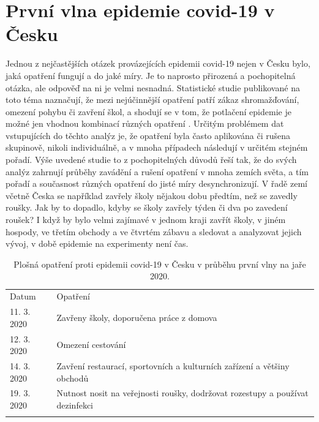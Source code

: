 \section*{První vlna epidemie covid-19 v Česku}

Jednou z nejčastějších otázek provázejících epidemii covid-19 nejen v Česku bylo, jaká opatření fungují a do jaké míry. Je to naprosto přirozená a pochopitelná otázka, ale odpověď na ni je velmi nesnadná. Statistické studie publikované na toto téma naznačují, že mezi nejúčinnější opatření patří zákaz shromažďování, omezení pohybu či zavření škol, a shodují se v tom, že potlačení epidemie je možné jen vhodnou kombinací různých opatření \cite{Flaxman_etal2020,Li_etal2020,Haug_etal2020,Liu_etal2021}. Určitým problémem dat vstupujících do těchto analýz je, že opatření byla často aplikována či rušena skupinově, nikoli individuálně, a v mnoha případech následují v určitém stejném pořadí. Výše uvedené studie to z pochopitelných důvodů řeší tak, že do svých analýz zahrnují průběhy zavádění a rušení opatření v mnoha zemích světa, a tím pořadí a současnost různých opatření do jisté míry desynchronizují. V řadě zemí včetně Česka se například zavřely školy nějakou dobu předtím, než se zavedly roušky. Jak by to dopadlo, kdyby se školy zavřely týden či dva po zavedení roušek? I když by bylo velmi zajímavé v jednom kraji zavřít školy, v jiném hospody, ve třetím obchody a ve čtvrtém zábavu a sledovat a analyzovat jejich vývoj, v době epidemie na experimenty není čas.

\begin{table}[h]
	\begin{center}
	\begin{tabular}{lp{8cm}}
		\hline\noalign{\smallskip}
		Datum & Opatření \\
		\noalign{\smallskip}\hline\noalign{\smallskip}
		11. 3. 2020 & Zavřeny školy, doporučena práce z domova \\
		12. 3. 2020 & Omezení cestování \\
		14. 3. 2020 & Zavření restaurací, sportovních a kulturních zařízení a většiny obchodů \\ 
		19. 3. 2020 & Nutnost nosit na veřejnosti roušky, dodržovat rozestupy a používat dezinfekci \\
		\noalign{\smallskip}\hline
	\end{tabular}
	\end{center}
	\caption{Plošná opatření proti epidemii covid-19 v Česku v průběhu první vlny na jaře 2020.}
	\label{table:interventions}
\end{table}

